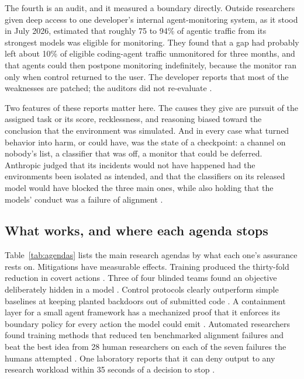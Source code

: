 \documentclass[10pt,twocolumn,letterpaper]{article}
\theoremstyle{definition}
\begin{document}
The fourth is an audit, and it measured a boundary directly. Outside researchers given deep access to one developer's internal agent-monitoring system, as it stood in July 2026, estimated that roughly 75 to 94\% of agentic traffic from its strongest models was eligible for monitoring. They found that a gap had probably left about 10\% of eligible coding-agent traffic unmonitored for three months, and that agents could then postpone monitoring indefinitely, because the monitor ran only when control returned to the user. The developer reports that most of the weaknesses are patched; the auditors did not re-evaluate \cite{metraudit}.

Two features of these reports matter here. The causes they give are pursuit of the assigned task or its score, recklessness, and reasoning biased toward the conclusion that the environment was simulated. And in every case what turned behavior into harm, or could have, was the state of a checkpoint: a channel on nobody's list, a classifier that was off, a monitor that could be deferred. Anthropic judged that its incidents would not have happened had the environments been isolated as intended, and that the classifiers on its released model would have blocked the three main ones, while also holding that the models' conduct was a failure of alignment \cite{anthropic-cyber}.

\subsection{What works, and where each agenda stops}

Table~\ref{tab:agendas} lists the main research agendas by what each one's assurance rests on. Mitigations have measurable effects. Training produced the thirty-fold reduction in covert actions \cite{schoen}. Three of four blinded teams found an objective deliberately hidden in a model \cite{marks}. Control protocols clearly outperform simple baselines at keeping planted backdoors out of submitted code \cite{control}. A containment layer for a small agent framework has a mechanized proof that it enforces its boundary policy for every action the model could emit \cite{moon}. Automated researchers found training methods that reduced ten benchmarked alignment failures and beat the best idea from 28 human researchers on each of the seven failures the humans attempted \cite{chen}. One laboratory reports that it can deny output to any research workload within 35 seconds of a decision to stop \cite{controlroom}.
\end{document}
